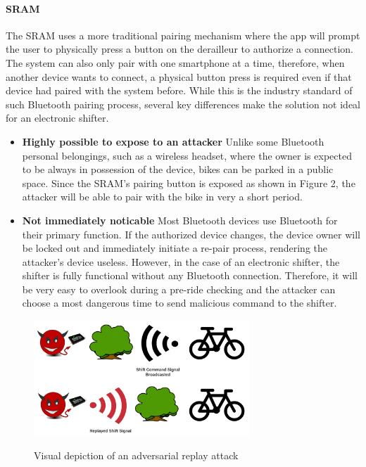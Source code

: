 \documentclass[letterpaper,twocolumn,10pt]{article}
\begin{document}
\paragraph{SRAM}
The SRAM uses a more traditional pairing mechanism where the app will prompt the user to physically press a button on the derailleur to authorize a connection. The system can also only pair with one smartphone at a time, therefore, when another device wants to connect, a physical button press is required even if that device had paired with the system before. While this is the industry standard of such Bluetooth pairing process, several key differences make the solution not ideal for an electronic shifter.

\begin{itemize}
  \item \textbf{Highly possible to expose to an attacker} Unlike some Bluetooth personal belongings, such as a wireless headset, where the owner is expected to be always in possession of the device, bikes can be parked in a public space. Since the SRAM's pairing button is exposed as shown in Figure 2, the attacker will be able to pair with the bike in very a short period.
  \item \textbf{Not immediately noticable} Most Bluetooth devices use Bluetooth for their primary function. If the authorized device changes, the device owner will be locked out and immediately initiate a re-pair process, rendering the attacker’s device useless. However, in the case of an electronic shifter, the shifter is fully functional without any Bluetooth connection. Therefore, it will be very easy to overlook during a pre-ride checking and the attacker can choose a most dangerous time to send malicious command to the shifter.
\end{itemize}

\begin{figure}[ht]
  \begin{center}
    \centering
    \includegraphics[width=230pt]{images/replay.png}
    \label{fig:Replay}
  \end{center}
  \caption{Visual depiction of an adversarial replay attack}
\end{figure}
\end{document}

